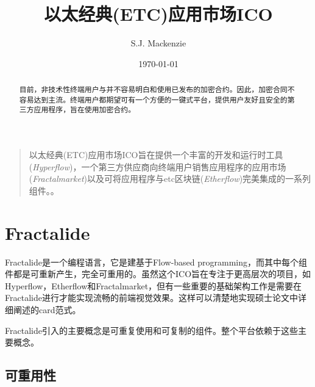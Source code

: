 \documentclass[%
 aip,
 jmp,
 amsmath,amssymb,
 preprint,
 reprint,
 author-year,
 author-numerical,
]{revtex4-1}
\begin{document}
\begin{CJK}{UTF8}{gbsn}

\title[以太经典(ETC)应用市场ICO]{以太经典(ETC)应用市场ICO}%


\author{S.J. Mackenzie}%

\date{\today}%

\begin{abstract}

目前，非技术性终端用户与并不容易明白和使用已发布的加密合约。因此，加密合同不容易达到主流。终端用户都期望可有一个方便的一键式平台，提供用户友好且安全的第三方应用程序，旨在使用加密合约。

\end{abstract}


\maketitle

\begin{quotation}

以太经典(ETC)应用市场ICO旨在提供一个丰富的开发和运行时工具(\textit{Hyperflow})，一个第三方供应商向终端用户销售应用程序的应用市场(\textit{Fractalmarket})以及可将应用程序与etc区块链(\textit{Etherflow})完美集成的一系列组件。。

\end{quotation}

\section{\label{sec:Fractalide}Fractalide}

Fractalide是一个编程语言，它是建基于Flow-based programming，而其中每个组件都是可重新产生，完全可重用的。虽然这个ICO旨在专注于更高层次的项目，如Hyperflow，Etherflow和Fractalmarket，但有一些重要的基础架构工作是需要在Fractalide进行才能实现流畅的前端视觉效果。这样可以清楚地实现硕士论文中详细阐述的card范式。

Fractalide引入的主要概念是可重复使用和可复制的组件。整个平台依赖于这些主要概念。

\subsection{\label{sec:reusability}可重用性}


\end{CJK}
\end{document}
